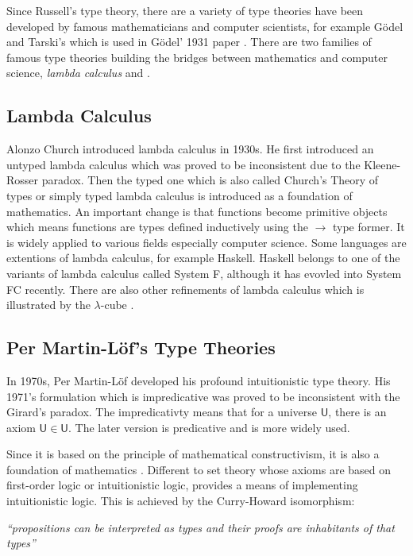Since Russell's type theory, there are a variety of type theories have been developed by famous mathematicians and computer scientists, for example Gödel and Tarski's which is used in Gödel' 1931 paper \cite{gdl:1931}. There are two families of famous type theories building the bridges between mathematics and computer science, \emph{lambda calculus} and \emph{\mltt}. 

\subsection{Lambda Calculus}

Alonzo Church introduced lambda calculus in 1930s. He first introduced
an untyped lambda calculus which was proved to be inconsistent due to
the Kleene-Rosser paradox. Then the typed one which is also called
Church's Theory of types or simply typed lambda calculus is
introduced as a foundation of mathematics. An important change is that functions become primitive objects which means functions are types defined inductively using the $\rightarrow$ type former. It is widely applied to
various fields especially computer science. Some languages are extentions of lambda calculus, for example Haskell. Haskell belongs to one of the variants of lambda calculus called System F, although it has evovled into System FC recently. There are also other refinements of lambda calculus which is illustrated by the $\lambda$-cube \cite{lambda-cube}.


\subsection{Per Martin-L\"{o}f's Type Theories}

In 1970s, Per Martin-L\"{o}f \cite{per:71,per:82}  developed his profound intuitionistic type theory. His 1971's formulation which is impredicative was proved to be inconsistent with the Girard's paradox. The impredicativty means that for a universe $\mathsf{U}$, there is an axiom $\mathsf{U} \in \mathsf{U}$\cite{Girard's}. The later version is predicative and is more widely used.

Since it is based on the principle of mathematical
constructivism, it is also a foundation of mathematics \cite{bishop?}. Different to set theory whose axioms are based on first-order logic or intuitionistic logic, \mltt provides a means of implementing intuitionistic logic. This is achieved by the Curry-Howard
isomorphism:

\emph{``propositions can be interpreted as types and their
  proofs are inhabitants of that types''} 

